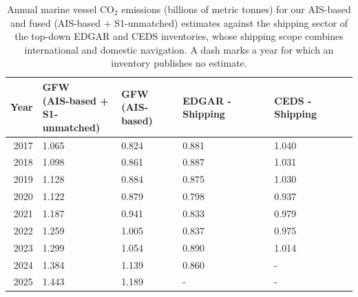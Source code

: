 \begin{table}[!h]
\centering
\caption{\label{tab:multisector_shipping_comparison}Annual marine vessel CO$_{2}$ emissions (billions of metric tonnes) for our AIS-based and fused (AIS-based + S1-unmatched) estimates against the shipping sector of the top-down EDGAR and CEDS inventories, whose shipping scope combines international and domestic navigation. A dash marks a year for which an inventory publishes no estimate.}
\centering
\fontsize{8}{10}\selectfont
\begin{tabular}[t]{r|l|l|l|l}
\hline
Year & \shortstack{GFW\\(AIS-based +\\S1-unmatched)} & \shortstack{GFW\\(AIS-based)} & EDGAR - Shipping & CEDS - Shipping\\
\hline
2017 & 1.065 & 0.824 & 0.881 & 1.040\\
\hline
2018 & 1.098 & 0.861 & 0.887 & 1.031\\
\hline
2019 & 1.128 & 0.884 & 0.875 & 1.030\\
\hline
2020 & 1.122 & 0.879 & 0.798 & 0.937\\
\hline
2021 & 1.187 & 0.941 & 0.833 & 0.979\\
\hline
2022 & 1.259 & 1.005 & 0.837 & 0.975\\
\hline
2023 & 1.299 & 1.054 & 0.890 & 1.014\\
\hline
2024 & 1.384 & 1.139 & 0.860 & -\\
\hline
2025 & 1.443 & 1.189 & - & -\\
\hline
\end{tabular}
\end{table}
